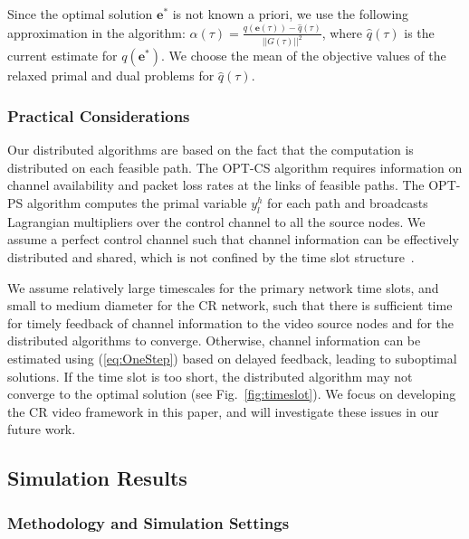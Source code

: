 \documentclass[12pt,onecolumn,draftclsnofoot]{IEEEtran} %
\begin{document}
Since the optimal solution $\mathbf{e}^{\ast}$ is not known a priori, we use the following approximation in the algorithm:
$\alpha(\tau)=\frac{q(\mathbf{e}(\tau))-\hat{q}(\tau)}{||G(\tau)||^2}$,
where $\hat{q}(\tau)$ is the current estimate for $q(\mathbf{e}^{\ast})$.  We choose the mean of the objective values of the relaxed primal and dual problems for $\hat{q}(\tau)$. 


\subsubsection{Practical Considerations} 

Our distributed algorithms are based on the fact that the computation is distributed on each feasible path.  The OPT-CS algorithm requires information on channel availability and packet loss rates at the links of feasible paths.  The OPT-PS algorithm computes the primal variable $y_l^h$ for each path and broadcasts Lagrangian multipliers over the control channel to all the source nodes.  We assume a perfect control channel such that channel information can be effectively distributed and shared, which is not confined by the time slot structure~\cite{Su08}.

We assume relatively large timescales for the primary network time slots, and small to medium diameter for the CR network, such that there is sufficient time for timely feedback of channel information to the video source nodes and for the distributed algorithms to converge.  Otherwise, channel information can be estimated using (\ref{eq:OneStep}) based on delayed feedback, leading to suboptimal solutions.  If the time slot is too short, the distributed algorithm may not converge to the optimal solution (see Fig.~\ref{fig:timeslot}).  We focus on developing the CR video framework in this paper, and will investigate these issues in our future work.

\subsection{Simulation Results \label{sec:sim1}}

\subsubsection{Methodology and Simulation Settings} 
\end{document}

